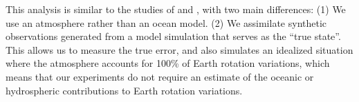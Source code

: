 This analysis is similar to the studies of \citet{Saynisch2010,Saynisch2011} and \citet{Saynisch2012}, with two main differences:
(1) We use an atmosphere rather than an ocean model.
(2) We assimilate synthetic observations generated from a model simulation that serves as the ``true state''. 
This allows us to measure the true error, and 
also simulates an idealized situation where the atmosphere accounts for 100\% of Earth rotation variations, which means that our experiments do not require an estimate of the oceanic or hydrospheric contributions to Earth rotation variations.
